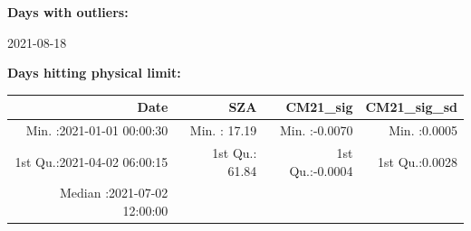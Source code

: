 \documentclass[
  10pt,
  a4paper,oneside]{article}
\begin{document}
\normalsize

\textbf{Days with outliers:}

2021-08-18

\textbf{Days hitting physical limit:}

\footnotesize

\begin{longtable}[]{@{}rrrr@{}}
\toprule
\begin{minipage}[b]{0.32\columnwidth}\raggedleft
Date\strut
\end{minipage} & \begin{minipage}[b]{0.18\columnwidth}\raggedleft
SZA\strut
\end{minipage} & \begin{minipage}[b]{0.19\columnwidth}\raggedleft
CM21\_sig\strut
\end{minipage} & \begin{minipage}[b]{0.19\columnwidth}\raggedleft
CM21\_sig\_sd\strut
\end{minipage}\tabularnewline
\midrule
\endhead
\begin{minipage}[t]{0.32\columnwidth}\raggedleft
Min. :2021-01-01 00:00:30\strut
\end{minipage} & \begin{minipage}[t]{0.18\columnwidth}\raggedleft
Min. : 17.19\strut
\end{minipage} & \begin{minipage}[t]{0.19\columnwidth}\raggedleft
Min. :-0.0070\strut
\end{minipage} & \begin{minipage}[t]{0.19\columnwidth}\raggedleft
Min. :0.0005\strut
\end{minipage}\tabularnewline
\begin{minipage}[t]{0.32\columnwidth}\raggedleft
1st Qu.:2021-04-02 06:00:15\strut
\end{minipage} & \begin{minipage}[t]{0.18\columnwidth}\raggedleft
1st Qu.: 61.84\strut
\end{minipage} & \begin{minipage}[t]{0.19\columnwidth}\raggedleft
1st Qu.:-0.0004\strut
\end{minipage} & \begin{minipage}[t]{0.19\columnwidth}\raggedleft
1st Qu.:0.0028\strut
\end{minipage}\tabularnewline
\begin{minipage}[t]{0.32\columnwidth}\raggedleft
Median :2021-07-02 12:00:00\strut
\end{minipage} & \begin{minipage}[t]{0.18\columnwidth}\raggedleft

\end{minipage}
\end{longtable}
\end{document}
